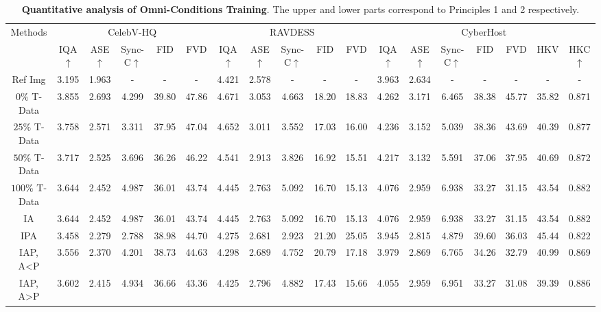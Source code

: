 \begin{table}[ht]
    \small
    \footnotesize
    \setlength{\tabcolsep}{2.5pt}
    \centering
    \caption{\small \textbf{Quantitative analysis of Omni-Conditions Training}. The upper and lower parts correspond to Principles 1 and 2 respectively.}
  \label{table:ablation}
  \centering
  \begin{tabular}{cccccccccccccccccc}
    \toprule
     \multirow{2}{*}{Methods} & \multicolumn{5}{c}{CelebV-HQ} & \multicolumn{5}{c}{RAVDESS}  & \multicolumn{7}{c}{CyberHost} \\
     \cmidrule(l){2-6}
     \cmidrule(l){7-11}
      \cmidrule(l){12-18}
     &IQA $\uparrow$ & ASE$\uparrow$ & Sync-C$\uparrow$ & FID & FVD
     &IQA $\uparrow$ & ASE$\uparrow$ & Sync-C$\uparrow$ & FID & FVD
     &IQA$\uparrow$  & ASE$\uparrow$ & Sync-C$\uparrow$  & FID & FVD & HKV & HKC$\uparrow$ \\
    \midrule
    Ref Img    &3.195 &1.963 &- &- &- &4.421 &2.578 &- &- &- &3.963 &2.634 &- &- &- &- &- \\
    $0\%$ T-Data      &3.855 &2.693 &4.299 &39.80 &47.86 &4.671 &3.053 &4.663 &18.20 &18.83  &4.262 &3.171 &6.465 &38.38 &45.77 &35.82 &0.871 \\
    $25\%$ T-Data   &3.758 &2.571 &3.311 &37.95 &47.04 &4.652 &3.011 &3.552 &17.03 &16.00 &4.236 &3.152 &5.039 &38.36 &43.69 &40.39 &0.877 \\
    $50\%$ T-Data  &3.717 &2.525 &3.696 &36.26 &46.22 &4.541 &2.913 &3.826 &16.92 &15.51  &4.217 &3.132 &5.591 &37.06 &37.95 &40.69 &0.872 \\
    $100\%$ T-Data &3.644 &2.452 &4.987 &36.01 &43.74 &4.445 &2.763 &5.092 &16.70 &15.13 &4.076 &2.959 &6.938 &33.27 &31.15 &43.54 &0.882 \\
    \midrule
    IA                       &3.644 &2.452 &4.987 &36.01 &43.74 &4.445 &2.763 &5.092 &16.70 &15.13 &4.076 &2.959 &6.938 &33.27 &31.15 &43.54 &0.882 \\
    IPA                      &3.458 &2.279 &2.788 &38.98 &44.70 &4.275 &2.681 &2.923 &21.20 &25.05 &3.945 &2.815 &4.879 &39.60 &36.03 &45.44 &0.822 \\
    IAP, A\textless P      &3.556 &2.370 &4.201 &38.73 &44.63 &4.298 &2.689 &4.752 &20.79 &17.18 &3.979 &2.869 &6.765 &34.26 &32.79 &40.99 &0.869 \\
    IAP, A\textgreater P   &3.602 &2.415 &4.934 &36.66 &43.36 &4.425 &2.796 &4.882 &17.43 &15.66 &4.055 &2.959 &6.951 &33.27 &31.08 &39.39 &0.886 \\
  \bottomrule
  \end{tabular}
\end{table}






